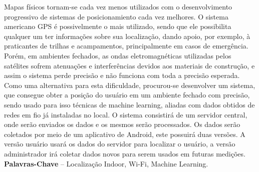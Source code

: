 \begin{resumo}

Mapas físicos tornam-se cada vez menos utilizados com o desenvolvimento progressivo
de sistemas de posicionamiento cada vez melhores. O sistema americano
GPS é possivelmente o mais utilizado, sendo que ele possibilita qualquer um ter informações
sobre sua localização, dando apoio, por exemplo, à praticantes de trilhas e
acampamentos, principalmente em casos de emergência. Porém, em ambientes fechados,
as ondas eletromagnéticas utilizadas pelos satélites sofrem atenuações e interferências
devidos aos materiais de construção, e assim o sistema perde precisão e não
funciona com toda a precisão esperada. Como uma alternativa para esta dificuldade,
procurou-se desenvolver um sistema, que consegue obter a posição do usuário em um
ambiente fechado com precisão, sendo usado para isso técnicas de machine learning,
aliadas com dados obtidos de redes em fio já instaladas no local. O sistema consistirá
de um servidor central, onde serão enviados os dados e os mesmos serão processados.
Os dados serão coletados por meio de um aplicativo de Android, este possuirá
duas versões. A versão usuário usará os dados do servidor para localizar o usuário, a
versão administrador irá coletar dados novos para serem usados em futuras medições.
%
\\[3\baselineskip]
%
\textbf{Palavras-Chave} -- Localização Indoor, Wi-Fi, Machine Learning.
\end{resumo}